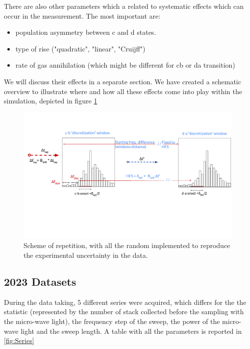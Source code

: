 \documentclass[11pt,a4paper,oneside]{article}
\newcommand{\commento}[1]{{\color{purple}{#1}}\vspace{10pt}}
\begin{document}
There are also other parameters which a related to systematic effects which can occur in the measurement. The most important are: 

\begin{itemize}
\item population asymmetry between c and d states.
\item type of rise ("quadratic", "linear", "Cruijff")
\item rate of gas annihilation (which might be different for cb or da transition)
\end{itemize}

We will discuss their effects in a separate section. We have created a schematic overview to illustrate where and how all these effects come into play within the simulation, depicted in figure \ref{fig:AschemeRandom}

\begin{figure}[!hbtp]
\centering
\includegraphics[width = \textwidth]{SchemeRepetition_crop.pdf}
\caption{Scheme of repetition, with all the random implemented to reproduce the experimental uncertainty in the data.}
\label{fig:AschemeRandom}
\end{figure}

\newpage
\subsection{2023 Datasets}

\commento{complete}
During the data taking, 5 different series were acquired, which differs for the the statistic (represented by the number of stack collected before the sampling with the micro-wave light), the frequency step of the sweep, the power of the micro-wave light and the sweep length. A table with all the parameters is reported in \ref{fig:Series} 
\end{document}
